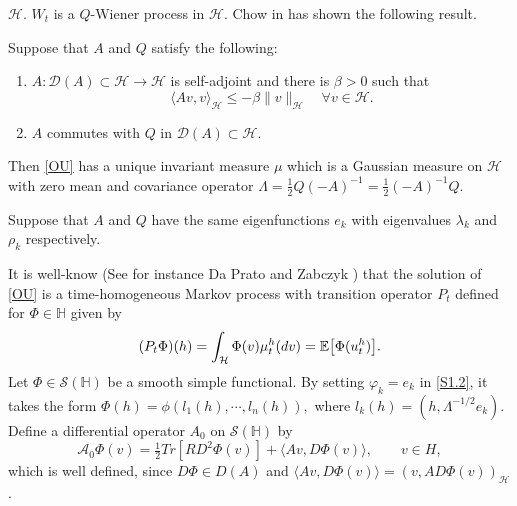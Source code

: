 \documentclass[review,onefignum,onetabnum]{siamart190516}
\begin{document}
    $\mathcal{H}$. $W_t$ is a $Q$-Wiener process
    in $\mathcal{H}$. Chow in \cite[Lemma 9.4.1]{liu} has shown the following
    result.
    \begin{lemma} \label{lemma-AQ}
        Suppose that $A$ and $Q$ satisfy the following:
        \begin{enumerate}
            \item
                $A:\mathcal{D}(A)\subset \mathcal{H}\rightarrow \mathcal{H}$ is
                self-adjoint and there is $\beta>0$ such that
                \[
                    \langle Av,v\rangle_ \mathcal{H}\le -\beta\|v
                    \|_\mathcal{H}\quad
                    \forall v\in \mathcal{H}.
                \]
            \item $A$ commutes with $Q$ in $\mathcal{D}(A)\subset \mathcal{H}$.
        \end{enumerate}
        Then \eqref{OU} has a unique invariant measure $\mu$ which is a Gaussian
        measure on $ \mathcal{H}$ with zero mean and covariance
        operator
        $
            \Lambda=
                \tfrac{1}{2}Q(-A)^{-1}
                =\tfrac{1}{2}(-A)^{-1}Q
        $.
    \end{lemma}

        Suppose that $A$ and $Q$ have the same eigenfunctions $e_k$ with 
        eigenvalues $\lambda_k$ and $\rho_k$ respectively.

        It is well-know (See for instance Da Prato and Zabczyk \cite{da-za}) 
    that the solution of \eqref{OU} is a time-homogeneous Markov process with 
    transition operator $P_t$  defined for $\Phi\in\mathbb{H}$ given by
    \begin{equation}
        (P_t\Phi)(h)=
            \int_{\mathcal{H}}
                 \Phi(v) \mu_t ^ h(dv)
                 = \mathbb{E}
                 \big[
                    \Phi(u_t^h)
                 \big].
    \end{equation}
        Let $\Phi\in\mathcal{S}(\mathbb{H})$ be a smooth simple functional. By
    setting $\varphi_k = e_k$ in \eqref{S1.2}, it takes the form
    $
      \Phi(h) = \phi(l_1(h), \cdots, l_n (h)),
    $
    where $l_k(h) = (h, \Lambda^{-1/2} e_k )$. Define a differential operator
    $A_0$ on $\mathcal{S}(\mathbb{H})$ by
    \begin{equation}
    \label{def-A0}
      \mathcal{A}_0
        \Phi(v) = \tfrac{1}{2} Tr [RD^2 \Phi(v)] 
            + \langle Av, D\Phi(v)\rangle
            ,\qquad v \in H,
    \end{equation}
    which is well defined, since $D\Phi \in D(A)$ and
    $\langle Av, D\Phi(v)\rangle = (v, A D \Phi(v))_\mathcal{H}$.
\end{document}
